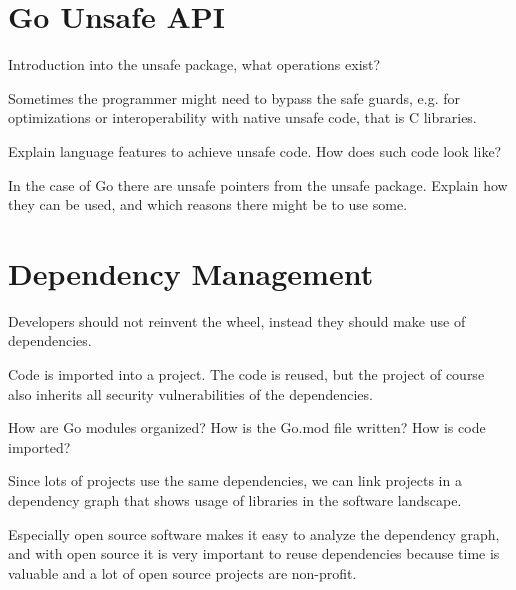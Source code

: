 \section{Go Unsafe API}\label{sec:background:unsafe-api}

Introduction into the unsafe package, what operations exist?

Sometimes the programmer might need to bypass the safe guards, e.g. for optimizations or
interoperability with native unsafe code, that is C libraries.

Explain language features to achieve unsafe code. How does such code look like?

In the case of Go there are unsafe pointers from the unsafe package. Explain how they
can be used, and which reasons there might be to use some.



\section{Dependency Management}\label{sec:background:dependencies}

Developers should not reinvent the wheel, instead they should make use of dependencies.

Code is imported into a project. The code is reused, but the project of course also inherits
all security vulnerabilities of the dependencies.

How are Go modules organized? How is the Go.mod file written? How is code imported?

Since lots of projects use the same dependencies, we can link projects in a dependency
graph that shows usage of libraries in the software landscape.

Especially open source software makes it easy to analyze the dependency graph, and with
open source it is very important to reuse dependencies because time is valuable and a lot
of open source projects are non-profit.
